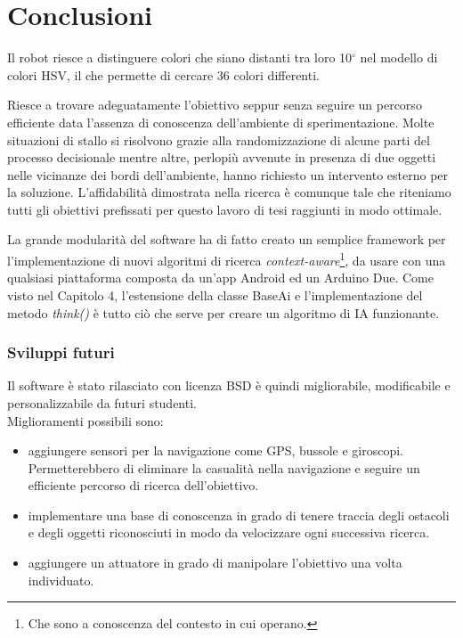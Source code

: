 \chapter*{Conclusioni}
\fancyfoot[C]{\thepage}
Il robot riesce a distinguere colori che siano distanti tra loro 10$^\circ$ nel modello di colori HSV,
il che permette di cercare 36 colori differenti. 

Riesce a trovare adeguatamente 
l'obiettivo seppur senza seguire un percorso efficiente data l'assenza di conoscenza 
dell'ambiente di sperimentazione. Molte situazioni di stallo si risolvono grazie alla randomizzazione 
di alcune parti del processo decisionale mentre altre, perlopiù avvenute in presenza di due 
oggetti nelle vicinanze dei bordi dell'ambiente, hanno richiesto un intervento esterno per la soluzione. 
L'affidabilità dimostrata nella ricerca è comunque tale che riteniamo tutti gli obiettivi 
prefissati per questo lavoro di tesi raggiunti in modo ottimale.

La grande modularità del software ha di fatto creato un semplice framework 
per l'implementazione di nuovi algoritmi di ricerca \emph{context-aware}\footnote{Che sono a conoscenza del contesto in cui operano.}, 
da usare con una qualsiasi piattaforma composta da un'app Android ed un Arduino Due. 
Come visto nel Capitolo 4, l'estensione della
classe BaseAi e l'implementazione del metodo \emph{think()} è tutto ciò che serve per
creare un algoritmo di IA funzionante.
\subsection* {Sviluppi futuri}
Il software è stato rilasciato con licenza BSD è quindi migliorabile, 
modificabile e personalizzabile da futuri studenti.
\\Miglioramenti possibili sono:
\begin{itemize}
\item aggiungere sensori per la navigazione come GPS, 
bussole e giroscopi. Permetterebbero di eliminare la casualità nella navigazione e seguire un efficiente percorso di ricerca dell'obiettivo.
\item implementare una base di conoscenza in grado di tenere traccia degli ostacoli e degli oggetti riconosciuti in modo da velocizzare ogni successiva ricerca.
\item aggiungere un attuatore in grado di manipolare l'obiettivo una volta individuato.
\end{itemize}

